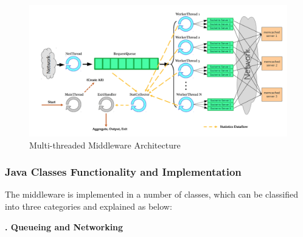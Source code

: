 \begin{figure}[!ht]
\centering
\includegraphics[width=1.0\textwidth]{img/1_System_Architecture.png}
\caption{\label{fig:architecture}Multi-threaded Middleware Architecture}
\end{figure}

\subsubsection{Java Classes Functionality and Implementation} \label{java_class_diagram}

The middleware is implemented in a number of classes, which can be classified into three categories and explained as below:

\noindent\textbf{\uppercase\expandafter{}. Queueing and Networking}

